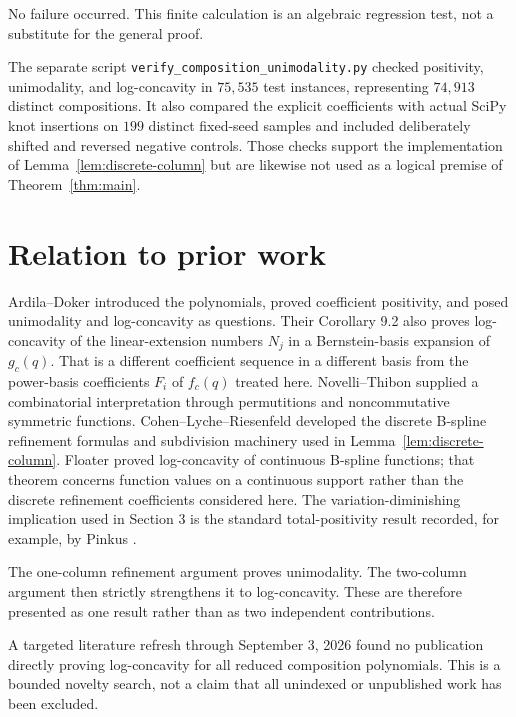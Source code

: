 \documentclass[11pt]{article}
\begin{document}
No failure occurred. This finite calculation is an algebraic regression test, not a substitute for
the general proof.

The separate script \texttt{verify\_composition\_unimodality.py} checked positivity, unimodality, and
log-concavity in $75{,}535$ test instances, representing $74{,}913$ distinct compositions. It also
compared the explicit coefficients with actual SciPy knot insertions on $199$ distinct fixed-seed
samples and included deliberately shifted and reversed negative controls. Those checks support the
implementation of Lemma~\ref{lem:discrete-column} but are likewise not used as a logical premise of Theorem~\ref{thm:main}.

\section{Relation to prior work}


Ardila--Doker \cite{ardila-doker} introduced the polynomials, proved coefficient positivity, and posed unimodality
and log-concavity as questions. Their Corollary 9.2 also proves log-concavity of the linear-extension
numbers $N_j$ in a Bernstein-basis expansion of $g_c(q)$. That is a different coefficient sequence
in a different basis from the power-basis coefficients $F_i$ of $f_c(q)$ treated here.
Novelli--Thibon \cite{novelli-thibon} supplied a combinatorial interpretation through permutitions and noncommutative
symmetric functions. Cohen--Lyche--Riesenfeld \cite{cohen-lyche-riesenfeld} developed the discrete B-spline refinement
formulas and subdivision machinery used in Lemma~\ref{lem:discrete-column}. Floater \cite{floater} proved log-concavity of continuous
B-spline functions; that theorem concerns function values on a continuous support rather than the
discrete refinement coefficients considered here. The variation-diminishing implication used in
Section 3 is the standard total-positivity result recorded, for example, by Pinkus \cite{pinkus}.

The one-column refinement argument proves unimodality. The two-column argument then strictly
strengthens it to log-concavity. These are therefore presented as one result rather than as two
independent contributions.

A targeted literature refresh through September 3, 2026 found no publication directly proving
log-concavity for all reduced composition polynomials. This is a bounded novelty search, not a claim
that all unindexed or unpublished work has been excluded.
\end{document}
